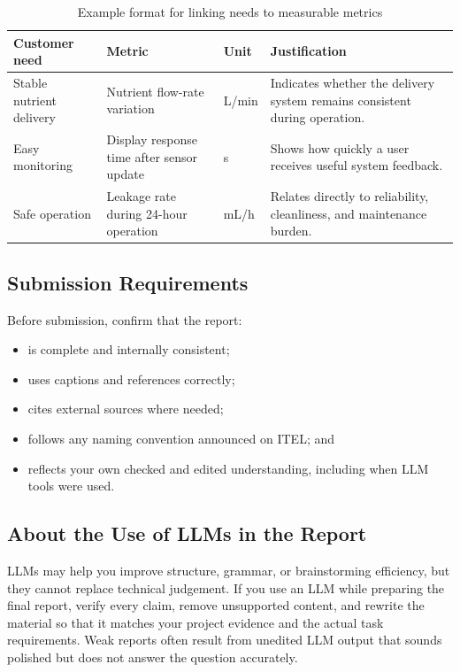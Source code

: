 \begin{table}[htbp]
\centering
\caption{Example format for linking needs to measurable metrics}
\label{tab:session0-final-report-metrics}
\renewcommand{\arraystretch}{1.2}
\begin{tabularx}{\textwidth}{|>{\raggedright\arraybackslash}X|>{\raggedright\arraybackslash}p{}|>{\raggedright\arraybackslash}p{}|>{\raggedright\arraybackslash}X|}
\hline
\textbf{Customer need} & \textbf{Metric} & \textbf{Unit} & \textbf{Justification} \\
\hline
Stable nutrient delivery & Nutrient flow-rate variation & L/min & Indicates whether the delivery system remains consistent during operation. \\
\hline
Easy monitoring & Display response time after sensor update & s & Shows how quickly a user receives useful system feedback. \\
\hline
Safe operation & Leakage rate during 24-hour operation & mL/h & Relates directly to reliability, cleanliness, and maintenance burden. \\
\hline
\end{tabularx}
\end{table}

\subsection{Submission Requirements}

Before submission, confirm that the report:
\begin{itemize}
    \item is complete and internally consistent;
    \item uses captions and references correctly;
    \item cites external sources where needed;
    \item follows any naming convention announced on ITEL; and
    \item reflects your own checked and edited understanding, including when LLM tools were used.
\end{itemize}

\subsection{About the Use of LLMs in the Report}

LLMs may help you improve structure, grammar, or brainstorming efficiency, but they cannot replace technical judgement. If you use an LLM while preparing the final report, verify every claim, remove unsupported content, and rewrite the material so that it matches your project evidence and the actual task requirements. Weak reports often result from unedited LLM output that sounds polished but does not answer the question accurately.
